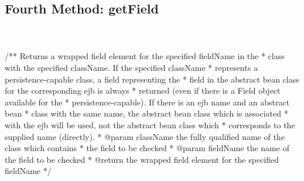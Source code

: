 \newpage
\subsection{Fourth Method: getField} \\ \\
	/** Returns a wrapped field element for the specified fieldName in the 
	 * class with the specified className.  If the specified className 
	 * represents a persistence-capable class, a field representing the 
	 * field in the abstract bean class for the corresponding ejb is always 
	 * returned (even if there is a Field object available for the 
	 * persistence-capable).  If there is an ejb name and an abstract bean
	 * class with the same name, the abstract bean class which is associated
	 * with the ejb will be used, not the abstract bean class which  
	 * corresponds to the supplied name (directly).
	 * @param className the fully qualified name of the class which contains
	 * the field to be checked
	 * @param fieldName the name of the field to be checked
	 * @return the wrapped field element for the specified fieldName
	 */
	 

